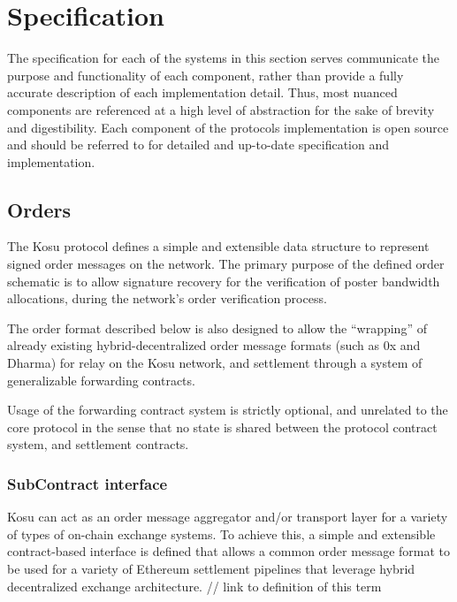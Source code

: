 \documentclass[10pt]{article}
\begin{document}
\section{Specification}\label{specification}

The specification for each of the systems in this section serves communicate the purpose and functionality of each component, rather than provide a fully accurate description of each implementation detail. Thus, most nuanced components are referenced at a high level of abstraction for the sake of brevity and digestibility. Each component of the protocols implementation is open source\cite{paradigm-github} and should be referred to for detailed and up-to-date specification and implementation. 

\subsection{Orders}\label{orders}

The Kosu protocol defines a simple and extensible data structure to represent signed order messages on the network. The primary purpose of the defined order schematic is to allow signature recovery for the verification of poster bandwidth allocations, during the network’s order verification process.
\medskip

The order format described below is also designed to allow the “wrapping” of already existing hybrid-decentralized order message formats (such as 0x and Dharma) for relay on the Kosu network, and settlement through a system of generalizable forwarding contracts. 
\medskip 

Usage of the forwarding contract system is strictly optional, and unrelated to the core protocol in the sense that no state is shared between the protocol contract system, and settlement contracts.

\subsubsection{SubContract interface}\label{subcontract-interface}

Kosu can act as an order message aggregator and/or transport layer for a variety of types of on-chain exchange systems. To achieve this, a simple and extensible contract-based interface is defined that allows a common order message format to be used for a variety of Ethereum settlement pipelines that leverage hybrid decentralized exchange architecture. // link to definition of this term
\medskip
\end{document}
